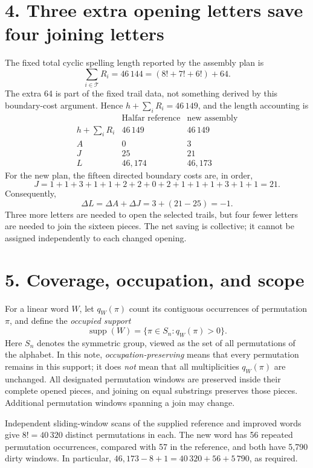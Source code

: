 \documentclass[11pt]{article}
\begin{document}
\section*{4. Three extra opening letters save four joining letters}
The fixed total cyclic spelling length reported by the assembly plan is
\[
\sum_{i\in\mathcal T}R_i=46\,144
=(8!+7!+6!)+64.
\]
The extra 64 is part of the fixed trail data, not something derived by
this boundary-cost argument. Hence \(h+\sum_iR_i=46\,149\),
and the length accounting is
\[
\begin{array}{l|r|r}
 &\text{Halfar reference}&\text{new assembly}\\ \hline
h+\sum_iR_i&46\,149&46\,149\\
A&0&3\\
J&25&21\\ \hline
L&46{,}174&46{,}173
\end{array}
\]
For the new plan, the fifteen directed boundary costs are, in order,
\[
J=1+1+3+1+1+2+2+0+2+1+1+1+3+1+1=21.
\]
Consequently,
\[
\boxed{\Delta L=\Delta A+\Delta J=3+(21-25)=-1.}
\]
Three more letters are needed to open the selected trails, but four
fewer letters are needed to join the sixteen pieces. The net saving is
collective; it cannot be assigned independently to each changed opening.

\section*{5. Coverage, occupation, and scope}
For a linear word \(W\), let \(q_W(\pi)\) count its contiguous occurrences
of permutation \(\pi\), and define the \emph{occupied support}
\[
\operatorname{supp}(W)=\{\pi\in S_n:q_W(\pi)>0\}.
\]
Here \(S_n\) denotes the symmetric group, viewed as the set of all
permutations of the alphabet. In this note, \emph{occupation-preserving}
means that every permutation remains in this support; it does
\emph{not} mean that all multiplicities \(q_W(\pi)\) are unchanged.
All designated permutation windows are preserved inside their complete
opened pieces, and joining on equal substrings preserves those pieces.
Additional permutation windows spanning a join may change.

Independent sliding-window scans of the supplied reference and improved
words give \(8!=40\,320\) distinct permutations in each. The new word
has 56 repeated permutation occurrences, compared with 57 in the
reference, and both have 5,790 dirty windows. In particular,
\(46{,}173-8+1=40\,320+56+5\,790\), as required.
\end{document}
